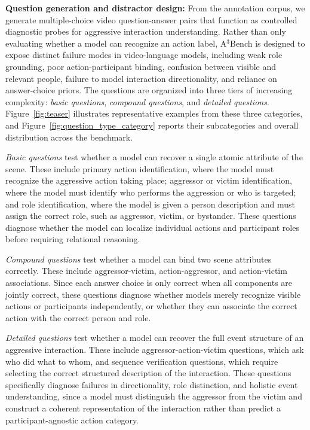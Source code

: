 \textbf{Question generation and distractor design:}
From the annotation corpus, we generate multiple-choice video question-answer pairs that function as controlled diagnostic probes for aggressive interaction understanding. Rather than only evaluating whether a model can recognize an action label, A$^3$Bench is designed to expose distinct failure modes in video-language models, including weak role grounding, poor action-participant binding, confusion between visible and relevant people, failure to model interaction directionality, and reliance on answer-choice priors.  The questions are organized into three tiers of increasing complexity: \textit{basic questions}, \textit{compound questions}, and \textit{detailed questions}. Figure~\ref{fig:teaser} illustrates representative examples from these three categories, and Figure~\ref{fig:question_type_category} reports their subcategories and overall distribution across the benchmark.

\textit{Basic questions} test whether a model can recover a single atomic attribute of the scene. These include primary action identification, where the model must recognize the aggressive action taking place; aggressor or victim identification, where the model must identify who performs the aggression or who is targeted; and role identification, where the model is given a person description and must assign the correct role, such as aggressor, victim, or bystander. These questions diagnose whether the model can localize individual actions and participant roles before requiring relational reasoning.

\textit{Compound questions} test whether a model can bind two scene attributes correctly. These include aggressor-victim, action-aggressor, and action-victim associations. Since each answer choice is only correct when all components are jointly correct, these questions diagnose whether models merely recognize visible actions or participants independently, or whether they can associate the correct action with the correct person and role.

\textit{Detailed questions} test whether a model can recover the full event structure of an aggressive interaction. These include aggressor-action-victim questions, which ask who did what to whom, and sequence verification questions, which require selecting the correct structured description of the interaction. These questions specifically diagnose failures in directionality, role distinction, and holistic event understanding, since a model must distinguish the aggressor from the victim and construct a coherent representation of the interaction rather than predict a participant-agnostic action category.


